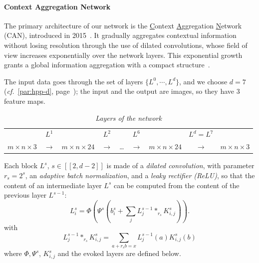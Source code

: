 \documentclass{article}
\begin{document}
            \paragraph{Context Aggregation Network}
            The primary architecture of our network is the \underline{C}ontext \underline{A}ggregation \underline{N}etwork (CAN), introduced in 2015~\cite{yu2015}. It gradually aggregates contextual information without losing resolution through the use of dilated convolutions, whose field of view increases exponentially over the network layers. This exponential growth grants a global information aggregation with a compact structure~\cite{yu2015,chen2017}.
            \par
            The input data goes through the set of layers $\{L^0, \cdots, L^d\}$, and we choose $d=7$ (\textit{cf.}~\ref{par:hpp-d}, page~\pageref{par:hpp-d}); the input and the output are images, so they have 3 feature maps.

            \begin{table}[!ht]
                \centering
                \begin{tabular}{ccccccccc}
                    \hline
                     & $L^1$ & & $L^2$ & & $L^6$ & & $L^d=L^7$ & \\
                    $m\times n\times 3$ & $\longrightarrow$ &$m\times n\times 24$ & $\longrightarrow$ & \dots & $\longrightarrow$ & $m\times n\times 24$ & $\longrightarrow$ & $m\times n\times 3$ \\
                    \hline
                \end{tabular}
                \caption{\textit{Layers of the network}}
            \end{table}
            \par
            Each block $L^s$, $s\in [\![2,d-2]\!]$ is made of a \textit{dilated convolution}, with parameter $r_s=2^s$, an \textit{adaptive batch normalization}, and a \textit{leaky rectifier (ReLU)}, so that the content of an intermediate layer $L^s$ can be computed from the content of the previous layer $L^{s-1}$:
            \begin{equation}
                L_i^s=\Phi\left(\Psi^s\left(b_i^s+\sum_jL_j^{s-1}*_{r_s}K^s_{i,j}\right)\right).
            \end{equation}
            with
            \begin{equation}
                L_j^{s-1}*_{r_s}K^s_{i,j}=\sum_{a+r_sb=x}L_j^{s-1}(a)K_{i,j}^s(b)
            \end{equation}
            where $\Phi, \Psi^s$, $K^s_{i,j}$ and the evoked layers are defined below.
\end{document}
